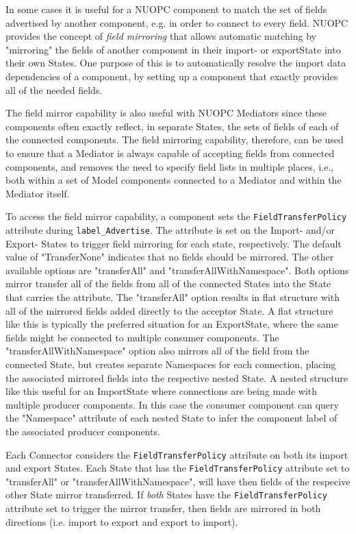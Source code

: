 %

\label{FieldMirror}

In some cases it is useful for a NUOPC component to match the set of fields advertised by another component, e.g. in order to connect to every field. NUOPC provides the concept of {\em field mirroring} that allows automatic matching by "mirroring" the fields of another component in their import- or exportState into their own States. One purpose of this is to automatically resolve the import data dependencies of a component, by setting up a component that exactly provides all of the needed fields.

The field mirror capability is also useful with NUOPC Mediators since these components often exactly reflect, in separate States, the sets of fields of each of the connected components.  The field mirroring capability, therefore, can be used to ensure that a Mediator is always capable of accepting fields from connected components, and removes the need to specify field lists in multiple places, i.e., both within a set of Model components connected to a Mediator and within the Mediator itself.

To access the field mirror capability, a component sets the {\tt FieldTransferPolicy} attribute during {\tt label\_Advertise}. The attribute is set on the Import- and/or Export- States to trigger field mirroring for each state, respectively.  The default value of "TransferNone" indicates that no fields should be mirrored.  The other available options are "transferAll" and "transferAllWithNamespace". Both options mirror transfer all of the fields from all of the connected States into the State that carries the attribute. The "transferAll" option results in flat structure with all of the mirrored fields added directly to the acceptor State. A flat structure like this is typically the preferred situation for an ExportState, where the same fields might be connected to multiple consumer components. The "transferAllWithNamespace" option also mirrors all of the field from the connected State, but creates separate Namespaces for each connection, placing the associated mirrored fields into the respective nested State. A nested structure like this useful for an ImportState where connections are being made with multiple producer components. In this case the consumer component can query the "Namespace" attribute of each nested State to infer the component label of the associated producer components.

Each Connector considers the {\tt FieldTransferPolicy} attribute on both its import and export States.  Each State that has the {\tt FieldTransferPolicy} attribute set to "transferAll" or "transferAllWithNamespace", will have then fields of the respecive other State mirror transferred. If {\em both} States have the {\tt FieldTransferPolicy} attribute set to trigger the mirror transfer, then fields are mirrored in both directions (i.e. import to export and export to import).

